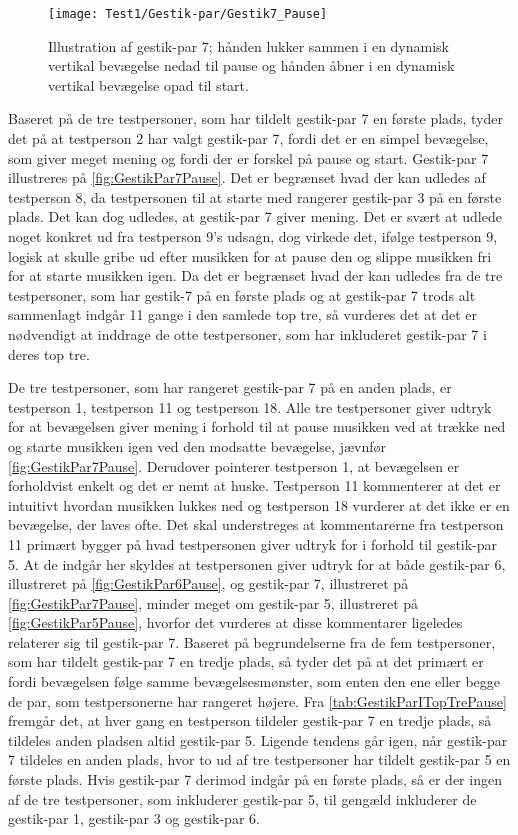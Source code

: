 %
\begin{figure}[H]
	\centering
	\texttt{[image: Test1/Gestik-par/Gestik7\_Pause]}
	\caption{Illustration af gestik-par 7; hånden lukker sammen i en dynamisk vertikal bevægelse nedad til pause og hånden åbner i en dynamisk vertikal bevægelse opad til start.}
	\label{fig:GestikPar7Pause}
\end{figure}
\noindent
%
Baseret på de tre testpersoner, som har tildelt gestik-par 7 en første plads, tyder det på at testperson 2 har valgt gestik-par 7, fordi det er en simpel bevægelse, som giver meget mening og fordi der er forskel på pause og start. Gestik-par 7 illustreres på \autoref{fig:GestikPar7Pause}. Det er begrænset hvad der kan udledes af testperson 8, da testpersonen til at starte med rangerer gestik-par 3 på en første plads. Det kan dog udledes, at gestik-par 7 giver mening. Det er svært at udlede noget konkret ud fra testperson 9's udsagn, dog virkede det, ifølge testperson 9, logisk at skulle gribe ud efter musikken for at pause den og slippe musikken fri for at starte musikken igen. Da det er begrænset hvad der kan udledes fra de tre testpersoner, som har gestik-7 på en første plads og at gestik-par 7 trods alt sammenlagt indgår 11 gange i den samlede top tre, så vurderes det at det er nødvendigt at inddrage de otte testpersoner, som har inkluderet gestik-par 7 i deres top tre. 

De tre testpersoner, som har rangeret gestik-par 7 på en anden plads, er testperson 1, testperson 11 og testperson 18. Alle tre testpersoner giver udtryk for at bevægelsen giver mening i forhold til at pause musikken ved at trække ned og starte musikken igen ved den modsatte bevægelse, jævnfør \autoref{fig:GestikPar7Pause}. Derudover pointerer testperson 1, at bevægelsen er forholdvist enkelt og det er nemt at huske. Testperson 11 kommenterer at det er intuitivt hvordan musikken lukkes ned og testperson 18 vurderer at det ikke er en bevægelse, der laves ofte. Det skal understreges at kommentarerne fra testperson 11 primært bygger på hvad testpersonen giver udtryk for i forhold til gestik-par 5. At de indgår her skyldes at testpersonen giver udtryk for at både gestik-par 6, illustreret på \autoref{fig:GestikPar6Pause}, og gestik-par 7, illustreret på \autoref{fig:GestikPar7Pause}, minder meget om gestik-par 5, illustreret på \autoref{fig:GestikPar5Pause}, hvorfor det vurderes at disse kommentarer ligeledes relaterer sig til gestik-par 7. Baseret på begrundelserne fra de fem testpersoner, som har tildelt gestik-par 7 en tredje plads, så tyder det på at det primært er fordi bevægelsen følge samme bevægelsesmønster, som enten den ene eller begge de par, som testpersonerne har rangeret højere. Fra \autoref{tab:GestikParITopTrePause} fremgår det, at hver gang en testperson tildeler gestik-par 7 en tredje plads, så tildeles anden pladsen altid gestik-par 5. Ligende tendens går igen, når gestik-par 7 tildeles en anden plads, hvor to ud af tre testpersoner har tildelt gestik-par 5 en første plads. Hvis gestik-par 7 derimod indgår på en første plads, så er der ingen af de tre testpersoner, som inkluderer gestik-par 5, til gengæld inkluderer de gestik-par 1, gestik-par 3 og gestik-par 6. 

